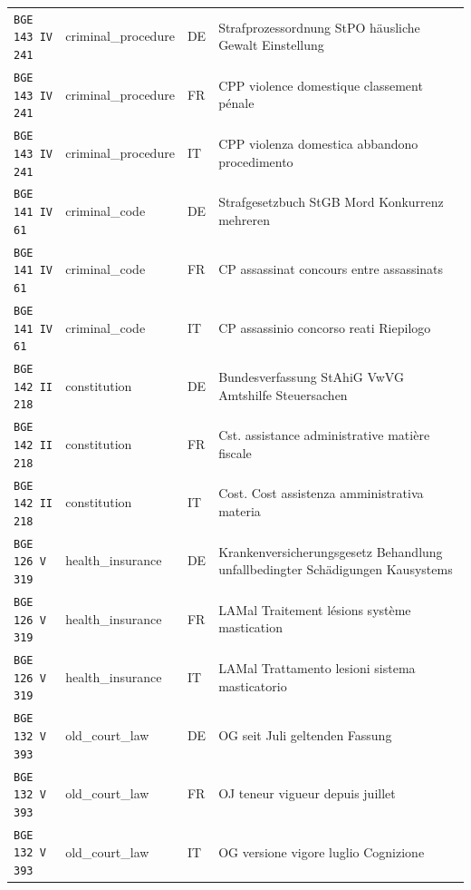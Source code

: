 \begin{table}[h]
\begin{tabular}{>{\raggedright\arraybackslash}p{2.2cm} >{\raggedright\arraybackslash}p{3.55cm} >{\raggedright\arraybackslash}p{0.8cm} >{\raggedright\arraybackslash}p{8.05cm}}
\texttt{BGE 143 IV 241} & criminal\_procedure & DE & Strafprozessordnung StPO häusliche Gewalt Einstellung \\
\texttt{BGE 143 IV 241} & criminal\_procedure & FR & CPP violence domestique classement pénale \\
\texttt{BGE 143 IV 241} & criminal\_procedure & IT & CPP violenza domestica abbandono procedimento \\
\texttt{BGE 141 IV 61} & criminal\_code & DE & Strafgesetzbuch StGB Mord Konkurrenz mehreren \\
\texttt{BGE 141 IV 61} & criminal\_code & FR & CP assassinat concours entre assassinats \\
\texttt{BGE 141 IV 61} & criminal\_code & IT & CP assassinio concorso reati Riepilogo \\
\texttt{BGE 142 II 218} & constitution & DE & Bundesverfassung StAhiG VwVG Amtshilfe Steuersachen \\
\texttt{BGE 142 II 218} & constitution & FR & Cst. assistance administrative matière fiscale \\
\texttt{BGE 142 II 218} & constitution & IT & Cost. Cost assistenza amministrativa materia \\
\texttt{BGE 126 V 319} & health\_insurance & DE & Krankenversicherungsgesetz Behandlung unfallbedingter Schädigungen Kausystems \\
\texttt{BGE 126 V 319} & health\_insurance & FR & LAMal Traitement lésions système mastication \\
\texttt{BGE 126 V 319} & health\_insurance & IT & LAMal Trattamento lesioni sistema masticatorio \\
\texttt{BGE 132 V 393} & old\_court\_law & DE & OG seit Juli geltenden Fassung \\
\texttt{BGE 132 V 393} & old\_court\_law & FR & OJ teneur vigueur depuis juillet \\
\texttt{BGE 132 V 393} & old\_court\_law & IT & OG versione vigore luglio Cognizione \\
\bottomrule
\end{tabular}
\end{table}
\clearpage
